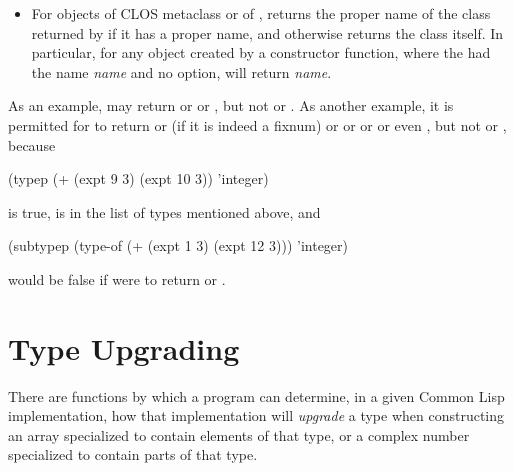 \begin{defun}[Function]
\begin{new}
\begin{itemize}
\item
For objects of CLOS metaclass  or of ,
 returns the proper name of the class returned by 
if it has a proper name, and otherwise returns the class itself.
In particular,
for any object created by a  constructor function,
where the  had the name \emph{name} and no  option,
 will return \emph{name}.
\end{itemize}

As an example, 
may return  or  or ,
but not  or .
As another example, it is permitted for
 to return
 or  (if it is indeed a fixnum) or
 or  or 
or even , but not  or , because
\begin{lisp}
(typep (+ (expt 9 3) (expt 10 3)) 'integer)
\end{lisp}
is true,  is in the list of types mentioned above, and
\begin{lisp}
(subtypep (type-of (+ (expt 1 3) (expt 12 3))) 'integer)
\end{lisp}
would be false if  were to return  or .
\end{new}
\end{defun}

\section{Type Upgrading}

There are functions by which a program
can determine, in a given Common Lisp implementation, how that
implementation will \emph{upgrade} a type when constructing an array
specialized to contain elements of that type,
or a complex number specialized to contain parts of that type.


